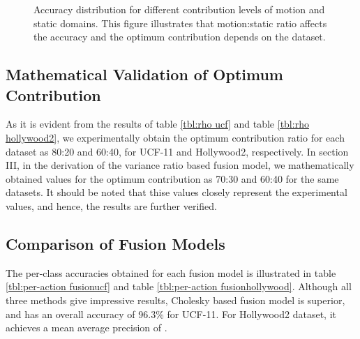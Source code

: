 \begin{figure}
\caption{Accuracy distribution for different contribution levels of motion and static domains.
This figure illustrates that motion:static ratio affects the accuracy and the optimum contribution depends on the dataset.}
\label{contribution chart}
\end{figure}


\subsection{Mathematical Validation of Optimum Contribution}
As it is evident from the results of table \ref{tbl:rho ucf} and table \ref{tbl:rho hollywood2}, we experimentally obtain the 
optimum contribution ratio for each dataset as 80:20 and 60:40, for UCF-11 and Hollywood2, respectively. In section III, in the derivation of the variance ratio based fusion model,
we mathematically obtained values for the optimum contribution as 70:30 and 60:40 for the same datasets. It should be noted that thise values closely
represent the experimental values, and hence, the results are further verified. 

\subsection{Comparison of Fusion Models}
The per-class accuracies obtained for each fusion model is illustrated in table \ref{tbl:per-action fusionucf} and 
table \ref{tbl:per-action fusionhollywood}. Although all three methods give impressive results, Cholesky based fusion
model is superior, and has an overall accuracy of 96.3\% for UCF-11. For Hollywood2 dataset, it achieves a mean average precision
of .


